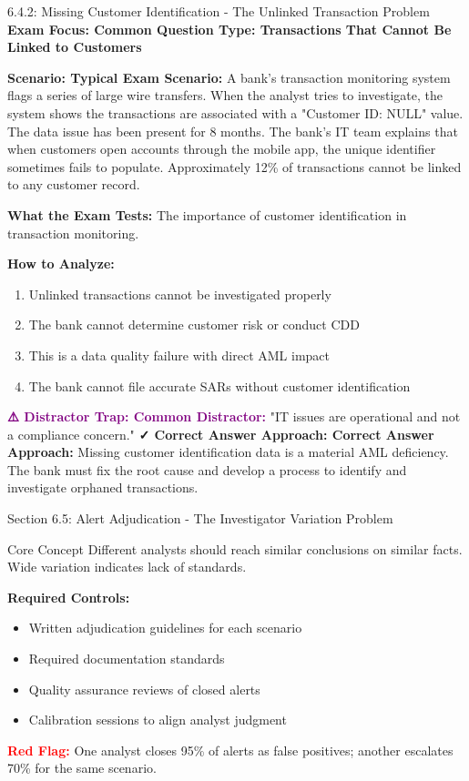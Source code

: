 \documentclass[11pt,a4paper]{beamer}
\newcommand{\redflag}[1]{\textcolor{red}{\textbf{#1}}}
\newcommand{\examfocus}[1]{\textcolor{orange!80!black}{\textbf{Exam Focus: #1}}}
\newcommand{\trap}[1]{\textcolor{purple}{\textbf{⚠️ Distractor Trap: #1}}}
\newcommand{\correct}[1]{\textcolor{green!50!black}{\textbf{✓ Correct Answer Approach: #1}}}
\newcommand{\scenario}[1]{\textcolor{blue!70!black}{\textbf{Scenario: #1}}}
\begin{document}
	\begin{frame}{6.4.2: Missing Customer Identification - The Unlinked Transaction Problem}
		\examfocus{Common Question Type: Transactions That Cannot Be Linked to Customers}
		
		\scenario{Typical Exam Scenario:}
		A bank's transaction monitoring system flags a series of large wire transfers. When the analyst tries to investigate, the system shows the transactions are associated with a "Customer ID: NULL" value. The data issue has been present for 8 months. The bank's IT team explains that when customers open accounts through the mobile app, the unique identifier sometimes fails to populate. Approximately 12\% of transactions cannot be linked to any customer record.
		
		\textbf{What the Exam Tests:} The importance of customer identification in transaction monitoring.
		
		\textbf{How to Analyze:}
		\begin{enumerate}
			\item Unlinked transactions cannot be investigated properly
			\item The bank cannot determine customer risk or conduct CDD
			\item This is a data quality failure with direct AML impact
			\item The bank cannot file accurate SARs without customer identification
		\end{enumerate}
		
		\trap{Common Distractor:} "IT issues are operational and not a compliance concern."
		\correct{Correct Answer Approach:} Missing customer identification data is a material AML deficiency. The bank must fix the root cause and develop a process to identify and investigate orphaned transactions.
	\end{frame}
	
	
	\begin{frame}{Section 6.5: Alert Adjudication - The Investigator Variation Problem}
		\begin{block}{Core Concept}
			Different analysts should reach similar conclusions on similar facts. Wide variation indicates lack of standards.
		\end{block}
		\textbf{Required Controls:}
		\begin{itemize}
			\item Written adjudication guidelines for each scenario
			\item Required documentation standards
			\item Quality assurance reviews of closed alerts
			\item Calibration sessions to align analyst judgment
		\end{itemize}
		\redflag{Red Flag:} One analyst closes 95\% of alerts as false positives; another escalates 70\% for the same scenario.
	\end{frame}
	
\end{document}
